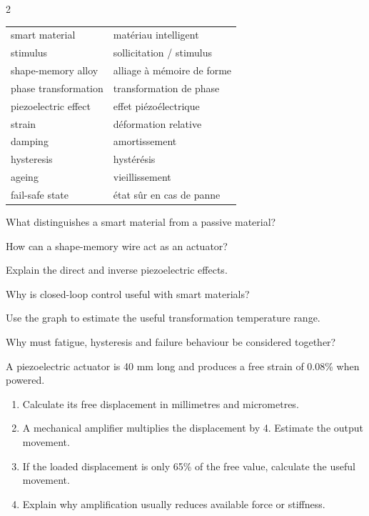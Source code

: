 \begin{multicols}{2}
\begin{vocabulary}
\begin{tabularx}{\linewidth}{@{}lX@{}}
smart material & matériau intelligent\\
stimulus & sollicitation / stimulus\\
shape-memory alloy & alliage à mémoire de forme\\
phase transformation & transformation de phase\\
piezoelectric effect & effet piézoélectrique\\
strain & déformation relative\\
damping & amortissement\\
hysteresis & hystérésis\\
ageing & vieillissement\\
fail-safe state & état sûr en cas de panne
\end{tabularx}
\end{vocabulary}

\begin{questions}
\item What distinguishes a smart material from a passive material?
\item How can a shape-memory wire act as an actuator?
\item Explain the direct and inverse piezoelectric effects.
\item Why is closed-loop control useful with smart materials?
\item Use the graph to estimate the useful transformation temperature range.
\item Why must fatigue, hysteresis and failure behaviour be considered together?
\end{questions}

\begin{applicationexercise}
A piezoelectric actuator is 40 mm long and produces a free strain of 0.08\% when powered.
\begin{enumerate}
\item Calculate its free displacement in millimetres and micrometres.
\item A mechanical amplifier multiplies the displacement by 4. Estimate the output movement.
\item If the loaded displacement is only 65\% of the free value, calculate the useful movement.
\item Explain why amplification usually reduces available force or stiffness.
\end{enumerate}
\end{applicationexercise}


\end{multicols}
